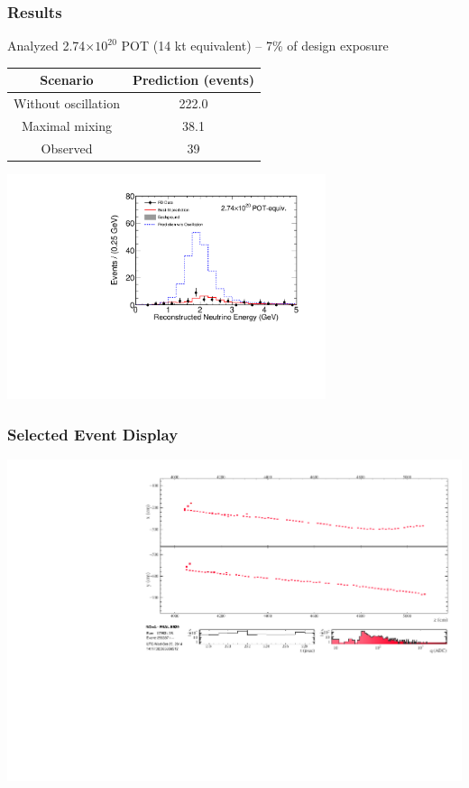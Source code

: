 \documentclass[10pt,professionalfonts,xcolor=table]{beamer}
\begin{document}
\begin{frame}
\frametitle{Results}
\centering
Analyzed 2.74$\times 10^{20}$ POT (14 kt equivalent) -- 7\% of \nova design exposure
\gap

\begin{tabular}{c c }
 \textcolor{custom_red}{Scenario} & \textcolor{custom_red}{Prediction (events)} \\ \hline
Without oscillation & 222.0 \\
Maximal mixing & 38.1 \\ \hline
Observed & 39

\end{tabular}

\includegraphics[angle=-90,width=0.7\textwidth]{figures/results/fd_data_mc_numi_plots/ccE_unblind_wUnosc.pdf}

\end{frame}


\begin{frame}
\frametitle{Selected Event Display}
\includegraphics[angle=-90, width=1\textwidth]{figures/results/evd/evd_xzyx-proj_17953_256887.pdf}
\end{frame}
\end{document}
